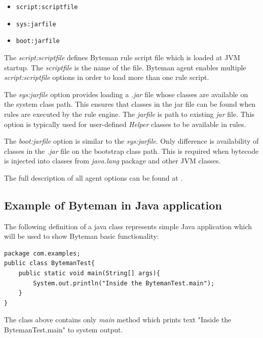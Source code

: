 \documentclass[12pt,oneside]{fithesis2}
\begin{document}
\begin{itemize}
	\item	\verb|script:scriptfile|
	\item	\verb|sys:jarfile|
	\item	\verb|boot:jarfile|
\end{itemize}

The \textit{script:scriptfile} defines Byteman rule script file which is loaded at JVM startup. The \textit{scriptfile} is the name of the file. Byteman agent enables multiple \textit{script:scriptfile} options in order to load more than one rule script.

The \textit{sys:jarfile} option provides loading a \textit{.jar} file whose classes are available on the system class path. This ensures that classes in the jar file can be found when rules are executed by the rule engine. The \textit{jarfile} is path to existing \textit{jar} file. This option is typically used for user-defined \textit{Helper} classes to be available in rules.

The \textit{boot:jarfile} option is similar to the \textit{sys:jarfile}. Only difference is availability of classes in the \textit{.jar} file on the bootstrap class path. This is required when bytecode is injected into classes from \textit{java.lang} package and other JVM classes.

The full description of all agent options can be found at \cite[Available -javaagent Options]{byteman_doc}.

\subsection{Example of Byteman in Java application}
The following definition of a java class represents simple Java application which will be used to show Byteman basic functionality:
\begin{lstlisting}[caption = Java class bypassed by the Byteman, label = class_use_case, style=eclipse_java]
package com.examples;
public class BytemanTest{
	public static void main(String[] args){
		System.out.println("Inside the BytemanTest.main");
	}
}
\end{lstlisting}
The class above contains only \textit{main} method which prints text "Inside the BytemanTest.main" to system output.
\end{document}
